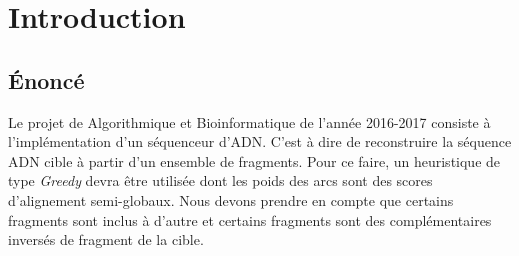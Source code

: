 \section{Introduction}
\subsection{Énoncé}
Le projet de Algorithmique et Bioinformatique de l'année 2016-2017 consiste à l'implémentation d'un séquenceur d'ADN.
C'est à dire de reconstruire la séquence ADN cible à partir d'un ensemble de fragments.
Pour ce faire, un heuristique de type \emph{Greedy} devra être utilisée dont les poids des arcs sont des scores d'alignement semi-globaux.
Nous devons prendre en compte que certains fragments sont inclus à d'autre et certains fragments sont des complémentaires inversés de fragment de la cible.